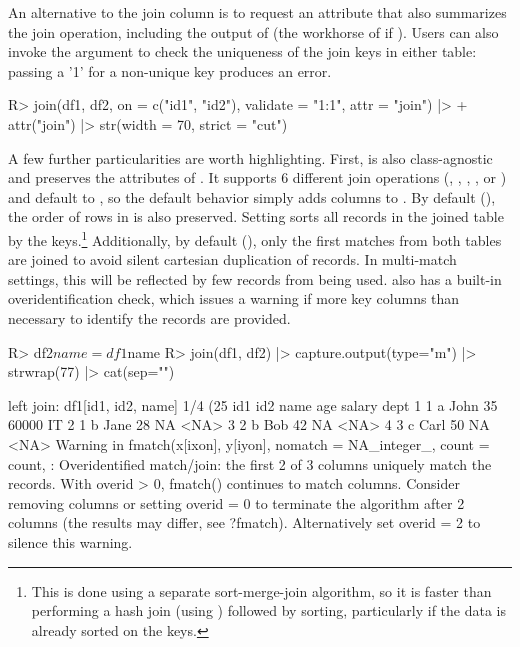 \documentclass[article]{jss}
\newcommand{\fct}[1]{\code{#1()}}
\begin{document}
%
An alternative to the join column is to request an attribute that also summarizes the join operation, including the output of \fct{fmatch} (the workhorse of \fct{join} if ). Users can also invoke the  argument to check the uniqueness of the join keys in either table: passing a '1' for a non-unique key produces an error.
%
\begin{Schunk}
\begin{Sinput}
R> join(df1, df2, on = c("id1", "id2"), validate = "1:1", attr = "join") |>
+    attr("join") |> str(width = 70, strict = "cut")
\end{Sinput}
\end{Schunk}
%
A few further particularities are worth highlighting. First,  is also class-agnostic and preserves the attributes of . It supports 6 different join operations (, , , ,  or ) and default to , so the default behavior simply adds columns to . By default (), the order of rows in  is also preserved. Setting  sorts all records in the joined table by the keys.\footnote{This is done using a separate sort-merge-join algorithm, so it is faster than performing a hash join (using \fct{fmatch}) followed by sorting, particularly if the data is already sorted on the keys. } Additionally, by default (), only the first matches from both tables are joined to avoid silent cartesian duplication of records. In multi-match settings, this will be reflected by few records from  being used. \fct{fmatch} also has a built-in overidentification check, which issues a warning if more key columns than necessary to identify the records are provided.
%
\begin{Schunk}
\begin{Sinput}
R> df2$name = df1$name
R> join(df1, df2) |> capture.output(type="m") |> strwrap(77) |> cat(sep="\n")
\end{Sinput}
\begin{Soutput}
left join: df1[id1, id2, name] 1/4 (25%) <m:m> df2[id1, id2, name] 1/4 (25%)
  id1 id2 name age salary dept
1   1   a John  35  60000   IT
2   1   b Jane  28     NA <NA>
3   2   b  Bob  42     NA <NA>
4   3   c Carl  50     NA <NA>
Warning in fmatch(x[ixon], y[iyon], nomatch = NA_integer_, count = count, :
Overidentified match/join: the first 2 of 3 columns uniquely match the
records. With overid > 0, fmatch() continues to match columns. Consider
removing columns or setting overid = 0 to terminate the algorithm after 2
columns (the results may differ, see ?fmatch). Alternatively set overid = 2
to silence this warning.
\end{Soutput}
\end{Schunk}
\end{document}
